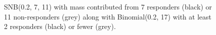 \documentclass[sii]{ipart}
\begin{document}
\begin{figure}[htbp!]
\centering
{}
\hfill
{}
\caption{
SNB(0.2, 7, 11) with mass contributed from 
7 responders (black) or 11 non-responders (grey) along with 
Binomial(0.2, 17) with at least 2 responders (black) or fewer (grey).
}
\label{fig:snb_bin_compare}
\end{figure}

\pagebreak
\end{document}

